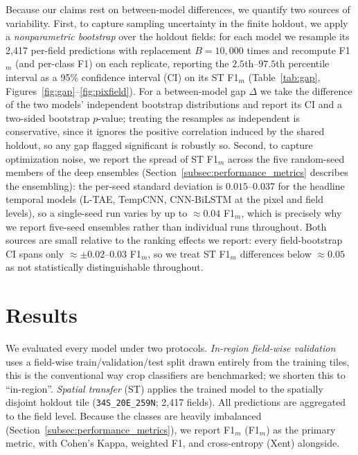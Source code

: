 \documentclass[pdflatex,sn-mathphys]{sn-jnl} %
\begin{document}
Because our claims rest on between-model differences, we quantify two sources of
variability. First, to capture sampling uncertainty in the finite holdout, we apply a
\emph{nonparametric bootstrap} over the holdout fields: for each model we resample its
2{,}417 per-field predictions with replacement $B=10{,}000$ times and recompute
F1$_m$ (and per-class F1) on each replicate, reporting the $2.5$th--$97.5$th percentile
interval as a 95\% confidence interval (CI) on its ST F1$_m$ (Table~\ref{tab:gap},
Figures~\ref{fig:gap}--\ref{fig:pixfield}). For a between-model gap $\Delta$ we take the
difference of the two models' independent bootstrap distributions and report its CI and a
two-sided bootstrap $p$-value; treating the resamples as independent is conservative,
since it ignores the positive correlation induced by the shared holdout, so any gap
flagged significant is robustly so. Second, to capture optimization noise, we report the
spread of ST F1$_m$ across the five random-seed members of the deep ensembles
(Section~\ref{subsec:performance_metrics} describes the ensembling): the per-seed standard
deviation is $0.015$--$0.037$ for the headline temporal models (L-TAE, TempCNN, CNN-BiLSTM
at the pixel and field levels), so a single-seed run varies by up to $\approx0.04$
F1$_m$, which is precisely why we report five-seed ensembles rather than individual runs
throughout. Both sources are small relative to the ranking effects we report: every
field-bootstrap CI spans only $\approx\pm0.02$--$0.03$ F1$_m$, so we treat ST F1$_m$
differences below $\approx0.05$ as not statistically distinguishable throughout.

\section{Results}
\label{sec:results}

We evaluated every model under two protocols. \emph{In-region field-wise validation} uses a
field-wise train/validation/test split drawn entirely
from the training tiles, this is the conventional way crop classifiers are benchmarked;
we shorten this to ``in-region''. \emph{Spatial transfer} (ST) applies the trained model to the spatially
disjoint holdout tile (\texttt{34S\_20E\_259N}; 2{,}417 fields). All predictions
are aggregated to the field level. Because the classes are heavily imbalanced
(Section~\ref{subsec:performance_metrics}), we report F1$_m$
(F1$_m$) as the primary metric, with Cohen's Kappa, weighted F1, and
cross-entropy (Xent) alongside.
\end{document}
